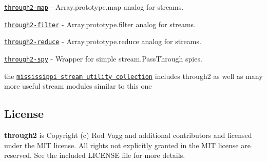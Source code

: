 \begin{DoxyItemize}
\item \href{https://github.com/brycebaril/through2-map}{\tt through2-\/map} -\/ Array.\+prototype.\+map analog for streams.
\item \href{https://github.com/brycebaril/through2-filter}{\tt through2-\/filter} -\/ Array.\+prototype.\+filter analog for streams.
\item \href{https://github.com/brycebaril/through2-reduce}{\tt through2-\/reduce} -\/ Array.\+prototype.\+reduce analog for streams.
\item \href{https://github.com/brycebaril/through2-spy}{\tt through2-\/spy} -\/ Wrapper for simple stream.\+Pass\+Through spies.
\item the \href{https://github.com/maxogden/mississippi}{\tt mississippi stream utility collection} includes {\ttfamily through2} as well as many more useful stream modules similar to this one
\end{DoxyItemize}

\subsection*{License}

{\bfseries through2} is Copyright (c) Rod Vagg \href{https://twitter.com/rvagg}{\tt } and additional contributors and licensed under the M\+IT license. All rights not explicitly granted in the M\+IT license are reserved. See the included L\+I\+C\+E\+N\+SE file for more details. 